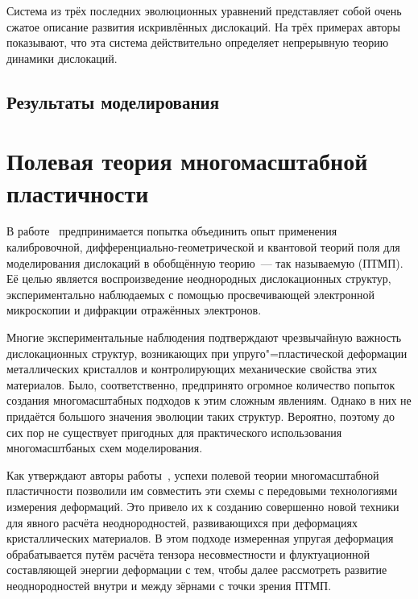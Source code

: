 \documentclass[a4paper, 14pt, titlepage]{extarticle}
\begin{document}
  Система из трёх последних эволюционных уравнений представляет собой очень сжатое описание развития
  искривлённых дислокаций. На трёх примерах авторы показывают, что эта система действительно
  определяет непрерывную теорию динамики дислокаций.

  \subsection{Результаты моделирования}


  \section{Полевая теория многомасштабной пластичности}

  В работе~\cite{hasebe-ftmp} предпринимается попытка объединить опыт применения калибровочной,
  дифференциально-геометрической и квантовой теорий поля для моделирования дислокаций в обобщённую
  теорию~--- так называемую  (ПТМП). Её целью
  является воспроизведение неоднородных дислокационных структур, экспериментально наблюдаемых с
  помощью просвечивающей электронной микроскопии и дифракции отражённых электронов.

  Многие экспериментальные наблюдения подтверждают чрезвычайную важность дислокационных структур,
  возникающих при упруго"=пластической деформации металлических кристаллов и контролирующих
  механические свойства этих материалов. Было, соответственно, предпринято огромное количество
  попыток создания многомасштабных подходов к этим сложным явлениям. Однако в них не придаётся
  большого значения эволюции таких структур. Вероятно, поэтому до сих пор не существует пригодных
  для практического использования многомасштбаных схем моделирования.

  Как утверждают авторы работы~\cite{hasebe-ftmp}, успехи полевой теории многомасштабной
  пластичности позволили им совместить эти схемы с передовыми технологиями измерения деформаций. Это
  привело их к созданию совершенно новой техники для явного расчёта неоднородностей, развивающихся
  при деформациях кристаллических материалов. В этом подходе измеренная упругая деформация
  обрабатывается путём расчёта тензора несовместности и флуктуационной составляющей энергии
  деформации с тем, чтобы далее рассмотреть развитие неоднородностей внутри и между зёрнами с точки
  зрения ПТМП.
\end{document}
